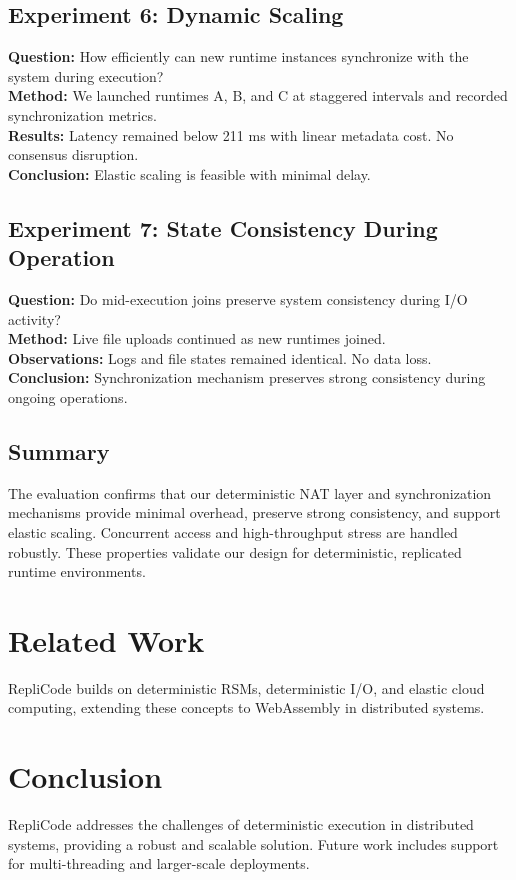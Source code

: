 \documentclass[10pt, 
]{IEEEtran}
\begin{document}
\subsection{Experiment 6: Dynamic Scaling}
\textbf{Question:} How efficiently can new runtime instances synchronize with the system during execution? \\ 
\textbf{Method:} We launched runtimes A, B, and C at staggered intervals and recorded synchronization metrics. \\ 
\textbf{Results:} Latency remained below 211 ms with linear metadata cost. No consensus disruption. \\ 
\textbf{Conclusion:} Elastic scaling is feasible with minimal delay.

\subsection{Experiment 7: State Consistency During Operation}
\textbf{Question:} Do mid-execution joins preserve system consistency during I/O activity? \\ 
\textbf{Method:} Live file uploads continued as new runtimes joined. \\ 
\textbf{Observations:} Logs and file states remained identical. No data loss. \\ 
\textbf{Conclusion:} Synchronization mechanism preserves strong consistency during ongoing operations.

\subsection{Summary}
The evaluation confirms that our deterministic NAT layer and synchronization mechanisms provide minimal overhead, preserve strong consistency, and support elastic scaling. Concurrent access and high-throughput stress are handled robustly. These properties validate our design for deterministic, replicated runtime environments.
\section{Related Work}
RepliCode builds on deterministic RSMs, deterministic I/O, and elastic cloud computing, extending these concepts to WebAssembly in distributed systems.

\section{Conclusion}
RepliCode addresses the challenges of deterministic execution in distributed systems, providing a robust and scalable solution. Future work includes support for multi-threading and larger-scale deployments.



\end{document}
